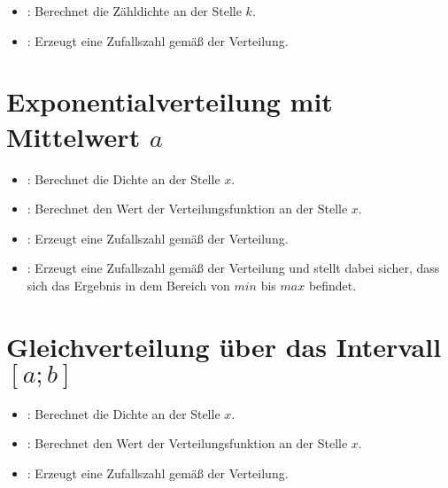 \begin{itemize}

\item
{}:
Berechnet die Zähldichte an der Stelle $k$.

\item
{}:
Erzeugt eine Zufallszahl gemäß der Verteilung.

\end{itemize}



\section{Exponentialverteilung mit Mittelwert \texorpdfstring{$a$}{a}}

\begin{itemize}

\item
{}:
Berechnet die Dichte an der Stelle $x$.

\item
{}:
Berechnet den Wert der Verteilungsfunktion an der Stelle $x$.

\item
{}:
Erzeugt eine Zufallszahl gemäß der Verteilung.

\item
{}:
Erzeugt eine Zufallszahl gemäß der Verteilung und stellt dabei sicher, dass sich das Ergebnis in dem Bereich von $min$ bis $max$ befindet.

\end{itemize}



\section{Gleichverteilung über das Intervall \texorpdfstring{$[a;b]$}{[a;b]}}

\begin{itemize}

\item
{}:
Berechnet die Dichte an der Stelle $x$.

\item
{}:
Berechnet den Wert der Verteilungsfunktion an der Stelle $x$.

\item
{}:
Erzeugt eine Zufallszahl gemäß der Verteilung.

\end{itemize}



